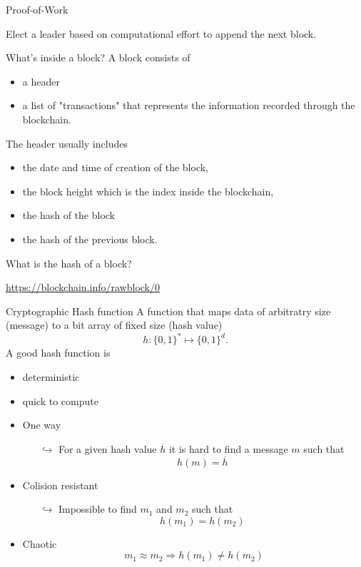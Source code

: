 \documentclass{beamer}
\begin{document}
\begin{frame}{Proof-of-Work}
\begin{tcolorbox}[enhanced,drop shadow, title=Objective]
    Elect a leader based on computational effort to append the next block.
\end{tcolorbox}
\end{frame}
\begin{frame}{What's inside a block?}
A block consists of 
\begin{itemize}
\item a header 
\item a list of "transactions" that represents the information recorded through the blockchain. 
\end{itemize}
The header usually includes 
\begin{itemize}
\item the date and time of creation of the block, 
\item the block height which is the index inside the blockchain, 
\item the hash of the block 
\item the hash of the previous block. 
\end{itemize}
\begin{tcolorbox}[enhanced,drop shadow, title=Question]
What is the hash of a block?
\end{tcolorbox}
\url{https://blockchain.info/rawblock/0}
\end{frame}
\begin{frame}{Cryptographic Hash function}
\small
A function that maps data of arbitratry size (message) to a bit array of fixed size (hash value)
$$
h:\{0,1\}^\ast\mapsto \{0,1\}^d. 
$$
A good hash function is
\begin{itemize}
\item deterministic
\item quick to compute
\item One way
\begin{itemize}
  \scriptsize
\item[$\hookrightarrow$] For a given hash value $\overline{h}$ it is hard to find a message $m$ such that 
$$
h(m) = \overline{h}
$$
\end{itemize}
\item Colision resistant 
\begin{itemize}
\item[$\hookrightarrow$] Impossible to find $m_1$ and $m_2$ such that 
$$
h(m_1) = h(m_2)
$$
\end{itemize}
\item Chaotic
$$m_1\approx m_2\Rightarrow  h(m_1) \neq h(m_2)$$
\end{itemize}
\end{frame}
\end{document}
